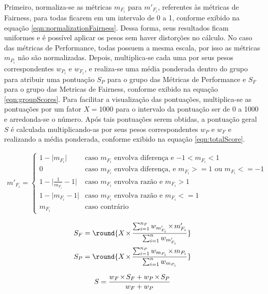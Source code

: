 \documentclass[twocolumn]{article}
\DeclarePairedDelimiter{\round}\lfloor\rceil
\let\oldtimes\times
\def\times{{\mkern1mu\oldtimes\mkern1mu}}
\begin{document}
Primeiro, normaliza-se as métricas $m_{F_i}$ para $m'_{F_i}$, referentes às métricas de Fairness, para todas ficarem em um intervalo de 0 a 1, conforme exibido na equação \ref{eqn:normalizationFairness}. Dessa forma, seus resultados ficam uniformes e é possível aplicar os pesos sem haver distorções no cálculo. No caso das métricas de Performance, todas possuem a mesma escala, por isso as métricas $m_{P_i}$ não são normalizadas. Depois, multiplica-se cada uma por seus pesos correspondentes $w_{P_i}$ e $w_{F_i}$, e realiza-se uma média ponderada dentro do grupo para atribuir uma pontuação $S_P$ para o grupo das Métricas de Performance e $S_F$ para o grupo das Metricas de Fairness, conforme exibido na equação \ref{eqn:groupScores}. Para facilitar a visualização das pontuações, multiplica-se as pontuações por um fator $X = 1000$ para o intervalo da pontuação ser de 0 a 1000 e arredonda-se o número. Após tais pontuações serem obtidas, a pontuação geral $S$ é calculada multiplicando-as por seus pesos correspondentes $w_P$ e $w_F$ e realizando a média ponderada, conforme exibido na equação \ref{eqn:totalScore}.

\begin{gather}
\label{eqn:normalizationFairness}
	m'_{F_i} = 
	\begin{cases}
	1-\lvert m_{F_i} \rvert & \text{caso $m_{F_i}$ envolva diferen\c{c}a e $-1 < m_{F_i} < 1$}\\
	0 & \text{caso $m_{F_i}$ envolva diferen\c{c}a, e $m_{F_i} >= 1$ ou $m_{F_i} <= -1$}\\
	1-\lvert \frac{1}{m_{F_i}}-1 \lvert & \text{caso $m_{F_i}$ envolva razão e $m_{F_i} > 1$}\\
	1-\lvert m_{F_i}-1 \lvert & \text{caso $m_{F_i}$ envolva razão e $m_{F_i} <= 1$}\\
	m_{F_i} & \text{caso contrário}
	\end{cases}
\end{gather}

\begin{equation}
\label{eqn:groupScores}
	\begin{aligned}
	S_F = \round{X \times \frac{\sum_{i=1}^{n_F} w_{m'_{F_i}} \times m'_{F_i}}{\sum_{i=1}^{n} w_{m'_{F_i}}}}\\
	S_P = \round{X \times \frac{\sum_{i=1}^{n_P} w_{m_{P_i}} \times m_{P_i}}{\sum_{i=1}^{n} w_{m_{P_i}}}}
	\end{aligned}
\end{equation}

\begin{equation}
\label{eqn:totalScore}
	S = \frac{w_F \times S_F + w_P \times S_P}{w_F + w_P}
\end{equation}
\end{document}
